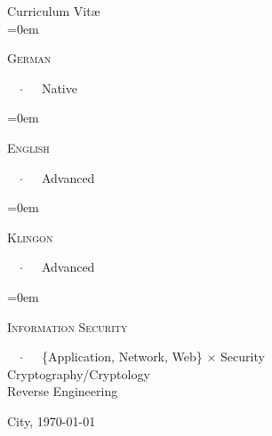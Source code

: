 \documentclass{scrartcl}
\newcommand{\Description}[1]{\hangindent=0em\hangafter=0\noindent\raggedright\footnotesize{#1}\par\normalsize\vspace{1em}}
\begin{document}
\begin{cv}{{\color{gray}Curriculum Vit\ae} \\ }
\Description{\parbox{\langbox}{\textsc{German}}\ \ $\cdotp$\ \ \ Native}

\vspace{-0.5em}

\Description{\parbox{\langbox}{\textsc{English}}\ \ $\cdotp$\ \ \ Advanced}

\vspace{-0.5em}

\Description{\parbox{\langbox}{\textsc{Klingon}}\ \ $\cdotp$\ \ \ Advanced}

\vspace{3em}


\vspace{1em}

\newlength{\intbox}

\settowidth{\intbox}{LONGEST INTEREST} 

\newcommand{\cspace}{\hspace{13.8em}}

\Description{\parbox{\intbox}{\textsc{Information Security}}\ \ $\cdotp$\ \ \ \{Application, Network, Web\} $\times$ Security\\ \cspace{}Cryptography/Cryptology\\\cspace{}Reverse Engineering}

\null
\vfill

City, \today
\end{cv}
\end{document}
